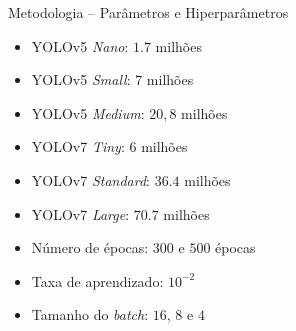 \begin{frame}{Metodologia -- Parâmetros e Hiperparâmetros}
\begin{itemize}
    \item \alert{YOLOv5} \emph{Nano}: $\num{1,7}$ milhões
    \item \alert{YOLOv5} \emph{Small}: $\num{7}$ milhões 
    \item \alert{YOLOv5} \emph{Medium}: ${20,8}$ milhões
    \ \ \newline
    \item \alert{YOLOv7} \emph{Tiny}: $\num{6}$ milhões
    \item \alert{YOLOv7} \emph{Standard}: $\num{36,4}$ milhões
    \item \alert{YOLOv7} \emph{Large}: $\num{70,7}$ milhões
    \ \ \newline
    \item Número de épocas: $300$ e $500$ épocas
    \item Taxa de aprendizado: $10^{-2}$
    \item Tamanho do \emph{batch}: $16$, $8$ e $4$
\end{itemize}
\end{frame}



